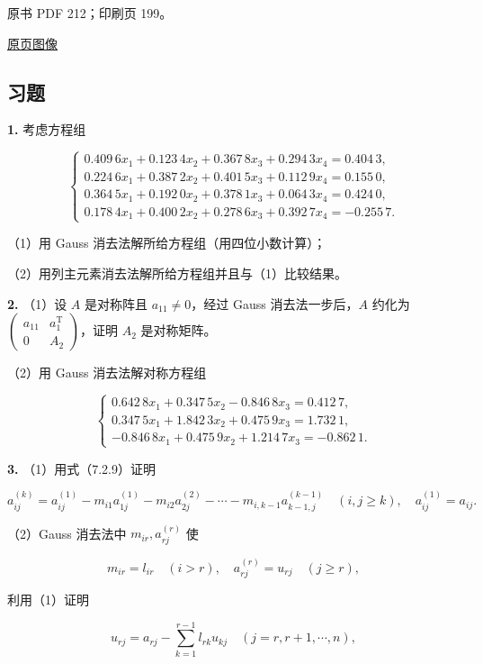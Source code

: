 \documentclass[
  10pt,
  fontset=fandol]{ctexart}
\begin{document}
\clearpage

原书 PDF 212；印刷页 199。

\href{../../../source-images/pdf-212.jpeg}{原页图像}

\subsection{习题}\label{ux4e60ux9898}

\textbf{1.} 考虑方程组

\[
\begin{cases}
0.409\,6x_1+0.123\,4x_2+0.367\,8x_3+0.294\,3x_4=0.404\,3,\\
0.224\,6x_1+0.387\,2x_2+0.401\,5x_3+0.112\,9x_4=0.155\,0,\\
0.364\,5x_1+0.192\,0x_2+0.378\,1x_3+0.064\,3x_4=0.424\,0,\\
0.178\,4x_1+0.400\,2x_2+0.278\,6x_3+0.392\,7x_4=-0.255\,7.
\end{cases}
\]

（1）用 Gauss 消去法解所给方程组（用四位小数计算）；

（2）用列主元素消去法解所给方程组并且与（1）比较结果。

\textbf{2.} （1）设 \(A\) 是对称阵且 \(a_{11}\neq0\)，经过 Gauss
消去法一步后，\(A\) 约化为
\(\begin{pmatrix}a_{11}&a_1^{\mathrm T}\\0&A_2\end{pmatrix}\)，证明
\(A_2\) 是对称矩阵。

（2）用 Gauss 消去法解对称方程组

\[
\begin{cases}
0.642\,8x_1+0.347\,5x_2-0.846\,8x_3=0.412\,7,\\
0.347\,5x_1+1.842\,3x_2+0.475\,9x_3=1.732\,1,\\
-0.846\,8x_1+0.475\,9x_2+1.214\,7x_3=-0.862\,1.
\end{cases}
\]

\textbf{3.} （1）用式（7.2.9）证明

\[
a_{ij}^{(k)}=a_{ij}^{(1)}-m_{i1}a_{1j}^{(1)}-m_{i2}a_{2j}^{(2)}-\cdots-m_{i,k-1}a_{k-1,j}^{(k-1)}
\quad(i,j\geqslant k),\quad a_{ij}^{(1)}=a_{ij}.
\]

（2）Gauss 消去法中 \(m_{ir},a_{rj}^{(r)}\) 使

\[
m_{ir}=l_{ir}\quad(i>r),\quad a_{rj}^{(r)}=u_{rj}\quad(j\geqslant r),
\]

利用（1）证明

\[
u_{rj}=a_{rj}-\sum_{k=1}^{r-1}l_{rk}u_{kj}\quad(j=r,r+1,\cdots,n),
\]
\end{document}
